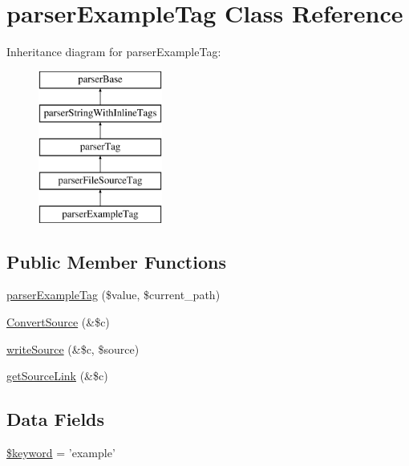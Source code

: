 \hypertarget{classparser_example_tag}{\section{parser\-Example\-Tag \-Class \-Reference}
\label{classparser_example_tag}
}
\-Inheritance diagram for parser\-Example\-Tag\-:\begin{figure}[H]
\begin{center}
\leavevmode
\includegraphics[height=5.000000cm]{classparser_example_tag}
\end{center}
\end{figure}
\subsection*{\-Public \-Member \-Functions}
\begin{DoxyCompactItemize}
\item 
\hyperlink{classparser_example_tag_a573b450bac5c92db592ce228fd1e50cc}{parser\-Example\-Tag} (\$value, \$current\-\_\-path)
\item 
\hyperlink{classparser_example_tag_ac04d3e20b49fa4ddfce71354ef2044f9}{\-Convert\-Source} (\&\$c)
\item 
\hyperlink{classparser_example_tag_aa8282e3797b5543b38d27aebf1ecd9db}{write\-Source} (\&\$c, \$source)
\item 
\hyperlink{classparser_example_tag_adabc9556631a05ea803bb7274eca1b95}{get\-Source\-Link} (\&\$c)
\end{DoxyCompactItemize}
\subsection*{\-Data \-Fields}
\begin{DoxyCompactItemize}
\item 
\hyperlink{classparser_example_tag_a4a925d6b38bcf3957c713a7d3dc7da1f}{\$keyword} = 'example'
\end{DoxyCompactItemize}


